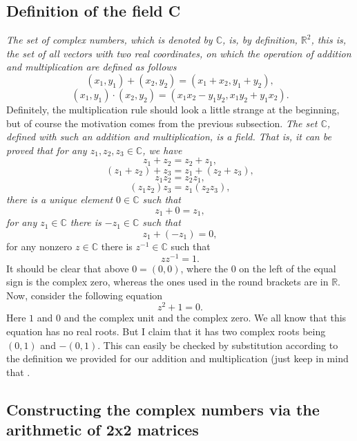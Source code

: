 \documentclass[12pt,oneside,openany]{memoir}
\numberwithin{equation}{subsection}
\begin{document}

\subsection{Definition of the field C}
\textit{The set of complex numbers, which is denoted by $\mathbb{C}$, is, by
definition, $\mathbb{R}^2$, this is, the set of all vectors with two real
coordinates, on which the operation of addition and multiplication are defined
as follows}
\[
	(x_1, y_1) + (x_2, y_2) = (x_1 + x_2, y_1 + y_2),
\]
\[
	(x_1, y_1) \cdot (x_2, y_2) = (x_1 x_2 - y_1 y_2, x_1 y_2 + y_1 x_2).
\]
Definitely, the multiplication rule should look a little strange at the
beginning, but of course the motivation comes from the previous subsection.
\bigbreak\noindent
\textit{The set $\mathbb{C}$, defined with such an addition and multiplication,
is a field. That is, it can be proved that for any
$z_1, z_2, z_3 \in \mathbb{C}$, we have}
\[
	z_1 + z_2 = z_2 + z_1,
\]
\[
	(z_1 + z_2) + z_3 = z_1 + (z_2 + z_3),
\]
\[
	z_1 z_2 = z_2 z_1,
\]
\[
	(z_1 z_2) z_3 = z_1 (z_2 z_3),
\]
\textit{there is a unique element $0 \in \mathbb{C}$ such that}
\[
	z_1 + 0 = z_1,
\]
\textit{for any $z_1 \in \mathbb{C}$ there is $-z_1 \in \mathbb{C}$ such that}
\[
	z_1 + (-z_1) = 0,
\]
for any nonzero $z \in \mathbb{C}$ there is $z^{-1} \in \mathbb{C}$ such that
\[
	z z^{-1} = 1.
\]
It should be clear that above $0 = (0, 0)$, where the $0$ on the left of the
equal sign is the complex zero, whereas the ones used in the round brackets are
in $\mathbb{R}$.
\bigbreak
Now, consider the following equation
\[
	z^2 + 1 = 0.
\]
Here $1$ and $0$ and the complex unit and the complex zero. We all know  that
this equation has  no real roots. But I claim that it has two complex roots
being $(0, 1)$ and $-(0, 1)$. This can easily be checked by substitution
according to the definition we provided for our addition and multiplication
(just keep in mind that .


\subsection{Constructing the complex numbers via the arithmetic of 2x2 matrices}
\end{document}
